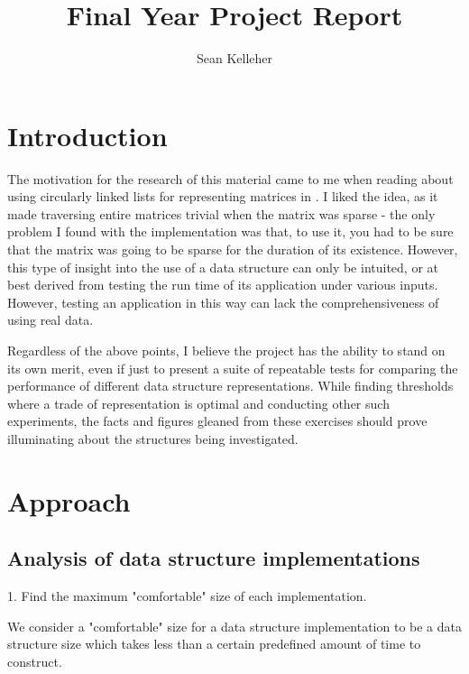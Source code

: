 \documentclass{report}
\title{Final Year Project Report}
\author{Sean Kelleher}
\begin{document}
\maketitle

\tableofcontents

\chapter{Introduction}

The motivation for the research of this material came to me when reading about
using circularly linked lists for representing matrices in \cite{Knuth:97}. I
liked the idea, as it made traversing entire matrices trivial when the matrix
was sparse - the only problem I found with the implementation was that, to use
it, you had to be sure that the matrix was going to be sparse for the duration
of its existence. However, this type of insight into the use of a data structure
can only be intuited, or at best derived from testing the run time of its
application under various inputs.  However, testing an application in this way
can lack the comprehensiveness of using real data.

Regardless of the above points, I believe the project has the ability to stand
on its own merit, even if just to present a suite of repeatable tests for
comparing the performance of different data structure representations. While
finding thresholds where a trade of representation is optimal and conducting
other such experiments, the facts and figures gleaned from these exercises
should prove illuminating about the structures being investigated.

\chapter{Approach}

\section{Analysis of data structure implementations}

1. Find the maximum "comfortable" size of each implementation.

We consider a "comfortable" size for a data structure implementation to be a
data structure size which takes less than a certain predefined amount of time to
construct.


\end{document}
